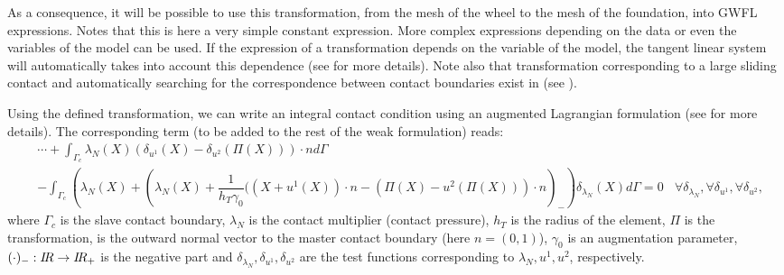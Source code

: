 \documentclass[a4paper,11pt,english]{sphinxmanual}
\begin{document}
\begin{sphinxVerbatim}[commandchars=\\\{\}]
   
\end{sphinxVerbatim}

As a consequence, it will be possible to use this transformation, from the mesh of the wheel to the mesh of the foundation, into GWFL expressions. Notes that this is here a very simple constant expression. More complex expressions depending on the data or even the variables of the model can be used. If the expression of a transformation depends on the variable of the model, the tangent linear system will automatically takes into account this dependence (see  for more details). Note also that transformation corresponding to a large sliding contact and automatically searching for the correspondence between contact boundaries exist in  (see ).

Using the defined transformation, we can write an integral contact condition using an augmented Lagrangian formulation (see  for more details). The corresponding term (to be added to the rest of the weak formulation) reads:
\begin{equation*}
\begin{split}& \cdots +  \int_{\Gamma_c} \lambda_N(X) (\delta_{u^1}(X)-\delta_{u^2}(\Pi(X)))\cdot n d\Gamma \\
& -   \int_{\Gamma_c} \left(\lambda_N(X) + \left(\lambda_N(X) + \dfrac{1}{h_T\gamma_0}((X + u^1(X))\cdot n - (\Pi(X) - u^2(\Pi(X)))\cdot n\right)_-\right)\delta_{\lambda_N}(X) d\Gamma = 0 ~~~~ \forall \delta_{\lambda_N}, \forall \delta_{u^1}, \forall \delta_{u^2},\end{split}
\end{equation*}
where \(\Gamma_c\) is the slave contact boundary, \(\lambda_N\) is the contact multiplier (contact pressure), \(h_T\) is the radius of the element, \(\Pi\) is the transformation,  is the outward normal vector to the master contact boundary (here \(n = (0,1)\)), \(\gamma_0\) is an augmentation parameter, \((\cdot)_-:I\hspace{-0.2em}R\rightarrow I\hspace{-0.2em}R_+\) is the negative part and \(\delta_{\lambda_N}, \delta_{u^1}, \delta_{u^2}\) are the test  functions corresponding to \(\lambda_N, u^1, u^2\), respectively.
\end{document}
